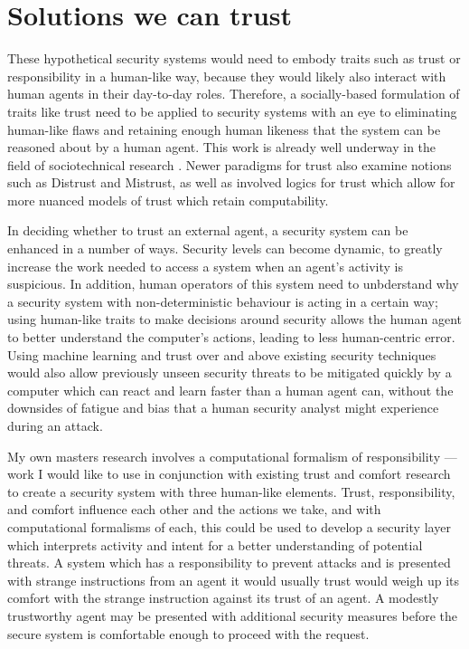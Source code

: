 \documentclass{tufte-handout}
\begin{document}
\section{Solutions we can trust}
These hypothetical security systems would need to embody traits such as trust or responsibility in a human-like way, because they would likely also interact with human agents in their day-to-day roles. Therefore, a socially-based formulation of traits like trust need to be applied to security systems with an eye to eliminating human-like flaws and retaining enough human likeness that the system can be reasoned about by a human agent. This work is already well underway in the field of sociotechnical research \cite{Marsh1994}. Newer paradigms for trust also examine notions such as Distrust and Mistrust, as well as involved logics for trust \cite{Kramdi} which allow for more nuanced models of trust which retain computability. \par

In deciding whether to trust an external agent, a security system can be enhanced in a number of ways. Security levels can become dynamic, to greatly increase the work needed to access a system when an agent's activity is suspicious. In addition, human operators of this system need to unbderstand why a security system with non-deterministic behaviour is acting in a certain way; using human-like traits to make decisions around security allows the human agent to better understand the computer's actions, leading to less human-centric error. Using machine learning and trust over and above existing security techniques would also allow previously unseen security threats to be mitigated quickly by a computer which can react and learn faster than a human agent can, without the downsides of fatigue and bias that a human security analyst might experience during an attack.\par

My own masters research involves a computational formalism of responsibility --- work I would like to use in conjunction with existing trust and comfort research to create a security system with three human-like elements. Trust, responsibility, and comfort influence each other and the actions we take, and with computational formalisms of each, this could be used to develop a security layer which interprets activity and intent for a better understanding of potential threats. A system which has a responsibility to prevent attacks and is presented with strange instructions from an agent it would usually trust would weigh up its comfort with the strange instruction against its trust of an agent. A modestly trustworthy agent may be presented with additional security measures before the secure system is comfortable enough to proceed with the request.\par
\end{document}

